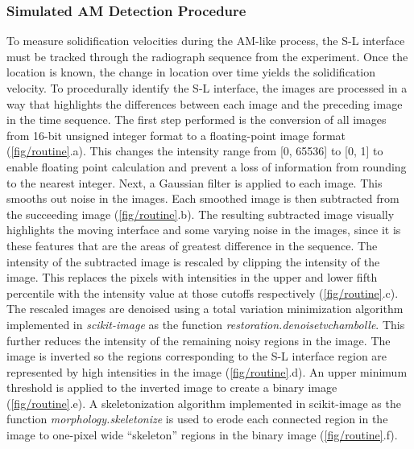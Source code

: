 \subsubsection{Simulated AM Detection Procedure}
To measure solidification velocities during the AM-like process, the S-L
interface must be tracked through the radiograph sequence from the
experiment. Once the location is known, the change in location over time
yields the solidification velocity. To procedurally identify the S-L
interface, the images are processed in a way that highlights the
differences between each image and the preceding image in the time
sequence. The first step performed is the conversion of all images from
16-bit unsigned integer format to a floating-point image format
(\ref{fig/routine}.a). This changes the intensity range from
[0, 65536] to [0, 1] to enable floating point calculation and prevent a loss
of information from rounding to the nearest integer. Next, a
Gaussian filter is applied to each image. This smooths out noise in
the images. Each smoothed image is then subtracted from the succeeding
image (\ref{fig/routine}.b). The resulting subtracted image visually
highlights the moving
interface and some varying noise in the images, since it is these features
that are the areas of greatest difference in the sequence. The intensity
of the subtracted image is rescaled by clipping the intensity of the
image. This replaces the pixels with intensities in the upper and lower
fifth percentile with the intensity value at those cutoffs
respectively (\ref{fig/routine}.c).
The rescaled images are denoised using a total
variation minimization algorithm \cite{Kokaram2004} implemented in
\textit{scikit-image} as the function
\textit{restoration.denoise\textunderscore tv\textunderscore chambolle}.
This further reduces the intensity of the remaining noisy regions in
the image. The image is inverted so the regions
corresponding to the S-L interface region are represented by high
intensities in the image (\ref{fig/routine}.d). An upper minimum
threshold is applied to the inverted image to create a binary image
(\ref{fig/routine}.e). A skeletonization algorithm \cite{Zhang1984}
implemented in scikit-image as the function \textit{morphology.skeletonize}
is used to erode each connected region in the image to one-pixel wide
``skeleton'' regions in the binary image (\ref{fig/routine}.f).

